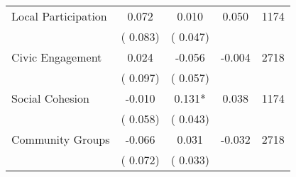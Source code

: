 \begin{tabular}{l*{4}{c}}
 Local Participation                       &              0.072 &         0.010            &              0.050     & 1174                             \\  
                                       &          (       0.083)               &        (       0.047)                                &                                               &                                               \\      

 Civic Engagement                       &              0.024 &        -0.056            &             -0.004     & 2718                             \\  
                                       &          (       0.097)               &        (       0.057)                                &                                               &                                               \\      

 Social Cohesion                       &             -0.010 &         0.131*            &              0.038     & 1174                             \\  
                                       &          (       0.058)               &        (       0.043)                                &                                               &                                               \\      

 Community Groups                       &             -0.066 &         0.031            &             -0.032     & 2718                             \\  
                                       &          (       0.072)               &        (       0.033)                                &                                               &                                               \\      

\hline \end{tabular}                                                                                                              
